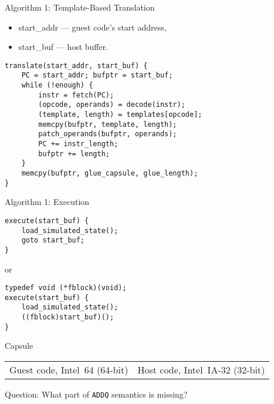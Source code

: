 \begin{frame}[fragile]{Algorithm 1: Template-Based Translation}
\begin{tiny}
\begin{itemize}
    \item start_addr --- guest code's start address,
    \item start_buf --- host buffer.
\end{itemize}
\end{tiny}

\begin{lstlisting}
translate(start_addr, start_buf) {
    PC = start_addr; bufptr = start_buf;
    while (!enough) {
        instr = fetch(PC);
        (opcode, operands) = decode(instr);
        (template, length) = templates[opcode];
        memcpy(bufptr, template, length);
        patch_operands(bufptr, operands);
        PC += instr_length;
        bufptr += length;
    }
    memcpy(bufptr, glue_capsule, glue_length);
}
\end{lstlisting}
\end{frame}

\begin{frame}[fragile]{Algorithm 1: Execution}

\begin{lstlisting}
execute(start_buf) {
    load_simulated_state();
    goto start_buf;
}
\end{lstlisting}
\pause
or
\begin{lstlisting}
typedef void (*fblock)(void);
execute(start_buf) {
    load_simulated_state();
    ((fblock)start_buf)();
}
\end{lstlisting}
\end{frame}


\begin{frame}{Capsule}
\begin{small}
\begin{tabular}{p{}p{}}
Guest code, Intel~64 (64-bit) & Host code, Intel~IA-32 (32-bit)
\end{tabular}
\end{small}
\vfill
\centering
{}
\pause
Question: What part of \texttt{ADDQ} semantics is missing?
\end{frame}

